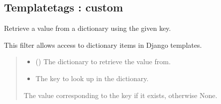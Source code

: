 \documentclass[letterpaper,10pt,english]{sphinxmanual}
\begin{document}
\subsection{Templatetags : custom}
\label{\detokenize{courses.templatetags:module-courses.templatetags.custom_tags}}\label{\detokenize{courses.templatetags:templatetags-custom}}\label{\detokenize{courses.templatetags::doc}}

\begin{fulllineitems}
\label{\detokenize{courses.templatetags:courses.templatetags.custom_tags.get_item}}
\pysigstartsignatures
\pysiglinewithargsret
{}
{\sphinxparamcomma {}}
{}
\pysigstopsignatures
\sphinxAtStartPar
Retrieve a value from a dictionary using the given key.

\sphinxAtStartPar
This filter allows access to dictionary items in Django templates.
\begin{quote}\begin{description}
\begin{itemize}
\item {} 
\sphinxAtStartPar
{} () \textendash{} The dictionary to retrieve the value from.

\item {} 
\sphinxAtStartPar
{} \textendash{} The key to look up in the dictionary.

\end{itemize}

\sphinxAtStartPar
The value corresponding to the key if it exists, otherwise None.

\end{description}\end{quote}

\end{fulllineitems}
\end{document}
